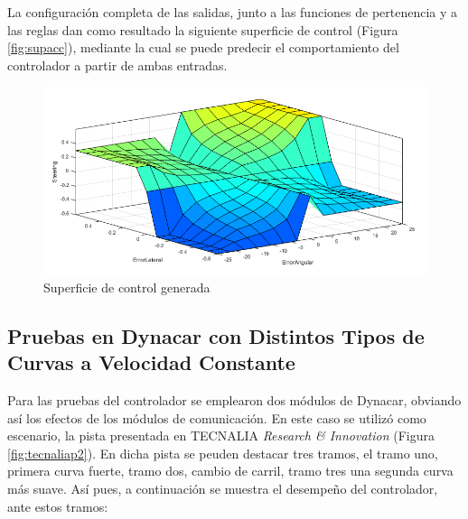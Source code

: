 \par La configuración completa de las salidas, junto a las funciones de pertenencia y a las reglas dan como resultado la siguiente superficie de control (Figura \ref{fig:supacc}), mediante la cual se puede predecir el comportamiento del controlador a partir de ambas entradas.\\

\begin{figure}[!h]
	\centering
		\includegraphics[scale=0.4]{Imagenes/supcl}
		\caption{Superficie de control generada}
		\label{fig:supcl}
\end{figure}	 


\subsection{Pruebas en Dynacar con Distintos Tipos de Curvas a Velocidad Constante}

Para las pruebas del controlador se emplearon dos módulos de Dynacar, obviando así los efectos de los módulos de comunicación. En este caso se utilizó como escenario, la pista presentada en TECNALIA \textit{Research \& Innovation} (Figura \ref{fig:tecnaliap2}). En dicha pista se peuden destacar tres tramos, el tramo uno, primera curva fuerte, tramo dos, cambio de carril, tramo tres una segunda curva más suave. Así pues, a continuación se muestra el desempeño del controlador, ante estos tramos:


